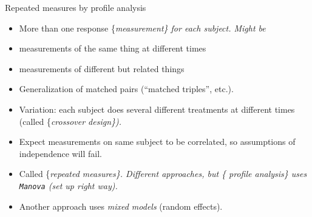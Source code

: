 \documentclass[ignorenonframetext,]{beamer}
\begin{document}
\begin{frame}[fragile]{Repeated measures by profile analysis}
\protect\hypertarget{repeated-measures-by-profile-analysis-1}{}

\begin{itemize}
\item
  More than one response \{\em measurement\} for each subject. Might be
\item
  measurements of the same thing at different times
\item
  measurements of different but related things
\item
  Generalization of matched pairs (``matched triples'', etc.).
\item
  Variation: each subject does several different treatments at different
  times (called \{\em crossover design\}).
\item
  Expect measurements on same subject to be correlated, so assumptions
  of independence will fail.
\item
  Called \{\em repeated measures\}. Different approaches, but \{\em
  profile analysis\} uses \texttt{Manova} (set up right way).
\item
  Another approach uses \emph{mixed models} (random effects).
\end{itemize}

\end{frame}
\end{document}
